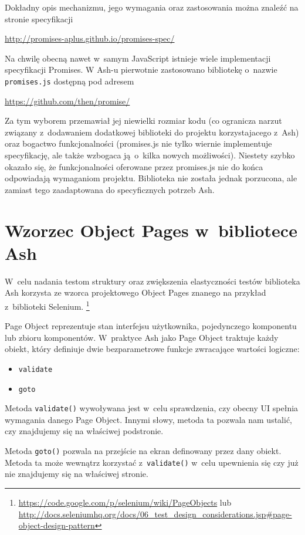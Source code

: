 \documentclass[brudnopis]{xmgr}
\begin{document}
Dokładny opis mechanizmu, jego wymagania oraz zastosowania można znaleźć na  stronie specyfikacji

\url{http://promises-aplus.github.io/promises-spec/}

Na chwilę obecną nawet w~samym JavaScript istnieje wiele implementacji specyfikacji Promises. W Ash-u pierwotnie zastosowano bibliotekę o~nazwie \texttt{promises.js} dostępną pod adresem

\url{https://github.com/then/promise/}

Za tym wyborem przemawiał jej niewielki rozmiar kodu (co ogranicza narzut związany z~dodawaniem dodatkowej biblioteki do projektu korzystajacego z~Ash) oraz bogactwo funkcjonalności (promises.js nie tylko wiernie implementuje specyfikację, ale także wzbogaca ją~o~kilka nowych możliwości). Niestety szybko okazało się, że funkcjonalności oferowane przez promises.js nie do końca odpowiadają wymaganiom projektu. Biblioteka nie została jednak porzucona, ale zamiast tego zaadaptowana do specyficznych potrzeb Ash.  

\section{Wzorzec Object Pages w~bibliotece Ash}

W~celu nadania testom struktury oraz zwiększenia elastyczności testów biblioteka Ash korzysta ze wzorca projektowego Object Pages znanego na przykład z~biblioteki Selenium. 
\footnote{ \url{https://code.google.com/p/selenium/wiki/PageObjects}
lub
\url{http://docs.seleniumhq.org/docs/06\_test\_design\_considerations.jsp\#page-object-design-pattern} }

Page Object reprezentuje stan interfejsu użytkownika, pojedynczego komponentu lub zbioru komponentów. W~praktyce Ash jako Page Object traktuje każdy obiekt, który definiuje dwie bezparametrowe funkcje zwracające wartości logiczne:

\begin{itemize}
  \item \texttt{validate}
  \item \texttt{goto}
\end{itemize}

Metoda \texttt{validate()} wywoływana jest w~celu sprawdzenia, czy obecny UI spełnia wymagania danego Page Object. Innymi słowy, metoda ta pozwala nam ustalić, czy znajdujemy się na właściwej podstronie. 

Metoda \texttt{goto()} pozwala na przejście na ekran definowany przez dany obiekt. Metoda ta może wewnątrz korzystać z~\texttt{validate()} w~celu upewnienia się czy już nie znajdujemy się na właściwej stronie. 
\end{document}

